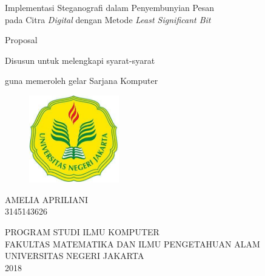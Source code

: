 \thispagestyle{empty}
\begin{center}
\large {Implementasi Steganografi dalam Penyembunyian Pesan \\ pada Citra \emph{Digital} dengan Metode \emph{Least Significant Bit}}
\end{center}
\bigskip
\vspace{2mm}


\begin{center}
\large{Proposal}

\large{Disusun untuk melengkapi syarat-syarat}

\large{guna memeroleh gelar Sarjana Komputer}

\end{center}


\vspace{5mm}

\begin{figure}[htbp]
\begin{center}
 \includegraphics[width=0.35\textwidth,]{gambar/unj.jpg}
       \end{center}
\end{figure}

\begin{center}
\large{AMELIA APRILIANI}\\
 \large{3145143626}
\end{center}

\vspace{20mm}

\begin{center}
{PROGRAM STUDI ILMU KOMPUTER\\
FAKULTAS MATEMATIKA DAN ILMU PENGETAHUAN ALAM \\
UNIVERSITAS NEGERI JAKARTA \\ 2018}
\end{center}
